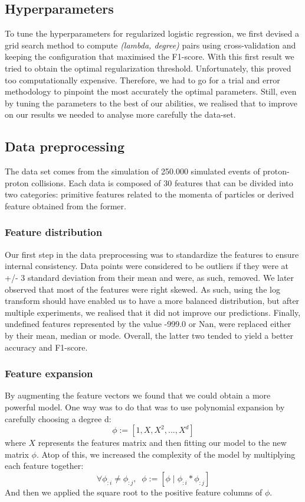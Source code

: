 \documentclass[10pt,conference,compsocconf]{IEEEtran}
\begin{document}
\subsection{Hyperparameters}
To tune the hyperparameters for regularized logistic regression, 
we first devised a grid search method to compute \textit{(lambda, degree)} 
pairs using cross-validation and keeping the configuration 
that maximised the F1-score. With this first result we tried to obtain 
the optimal regularization threshold.
Unfortunately, this proved too computationally expensive. Therefore, 
we had to go for a trial and error methodology to pinpoint the most 
accurately the optimal parameters.
Still, even by tuning the parameters to the best of our abilities, 
we realised that to improve on our results we needed to analyse more 
carefully the data-set.

\subsection{Data preprocessing}
The data set comes from the simulation of 250.000 simulated events 
of proton-proton collisions. Each data is composed of 30 features 
that can be divided into two categories: primitive features related 
to the momenta of particles or derived feature obtained from the former.

\subsubsection{Feature distribution}
Our first step in the data preprocessing was to standardize the features 
to ensure internal consistency. Data points were considered to be 
outliers if they were at +/- 3 standard deviation from their mean and 
were, as such, removed. We later observed that most of the features 
were right skewed. As such, using the log transform should have enabled 
us to have a more balanced distribution, but after multiple experiments, 
we realised that it did not improve our predictions. 
Finally, undefined features represented by the value -999.0 or Nan, 
were replaced either by their mean, median or mode. Overall, the 
latter two tended to yield a better accuracy and F1-score.

\subsubsection{Feature expansion}
By augmenting the feature vectors we found that we could obtain a more 
powerful model. One way was to do that was to use polynomial expansion 
by carefully choosing a degree d:
$$\phi := [1, X, X^2, ..., X^d]$$
where $X$ represents the features matrix and then fitting our model 
to the new matrix $\phi$. Atop of this, we increased the complexity 
of the model by multiplying each feature together:
$$\forall \phi_{:i} \neq \phi_{:j}, \;\; \phi := [\phi\; |\; \phi_{:i} * \phi_{:j}] $$
And then we applied the square root to the positive feature columns 
of $\phi$.
\end{document}
